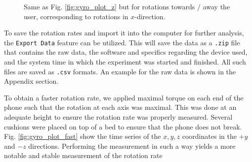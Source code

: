 \documentclass[a4paper]{article}
\begin{document}
\begin{figure}[hbt!]
	\centering
	\quad

	\caption{Same as Fig. \ref{fig:gyro_plot_z} but for rotations towards / away the user, corresponding to rotations in $x$-direction.}
	\label{fig:gyro_plot_x}
\end{figure}

To save the rotation rates and import it into the computer for further analysis, the \texttt{Export Data} feature can be utilized. This will save the 
data as a \texttt{.zip} file that contains the raw data, the software and specifics regarding the device used, and the system time in which the experiment was 
started and finished. All such files are saved as \texttt{.csv} formats. An example for the raw data is shown in the Appendix section.\par 

To obtain a faster rotation rate, we applied maximal torque on each end of the phone such that the rotation at each axis was maximal. This was done at an adequate height
to ensure the rotation rate was properly measured. Several cushions were placed on top of a bed to ensure that the phone does not break. Fig. \ref{fig:gyro_plot_fast} show
the time series of the $x, y, z$ coordinates in the $+y$ and $-z$ directions. Performing the measurement in such a way yields a more notable and stable measurement of the rotation rate 
\end{document}
